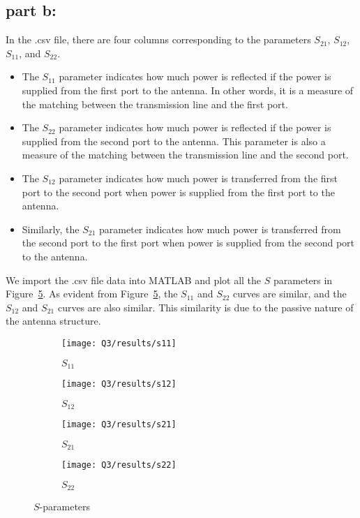 \documentclass[12pt,onecolumn,a4paper]{article}
\begin{document}
	
	
	\FloatBarrier
	\subsection{part b:}
	
	In the .csv file, there are four columns corresponding to the parameters $S_{21}$, $S_{12}$, $S_{11}$, and $S_{22}$. 

	\begin{itemize}
		\item The $S_{11}$ parameter indicates how much power is reflected if the power is supplied from the first port to the antenna. 
		In other words, it is a measure of the matching between the transmission line and the first port. 
		\item The $S_{22}$ parameter indicates how much power is reflected if the power is supplied from the second port to the antenna. 
		This parameter is also a measure of the matching between the transmission line and the second port. 
		\item The $S_{12}$ parameter indicates how much power is transferred from the first port to the second port when power is supplied from the first port to the antenna. 
		\item Similarly, the $S_{21}$ parameter indicates how much power is transferred from the second port to the first port when power is supplied from the second port to the antenna. 
	\end{itemize}

	We import the .csv file data into MATLAB and plot all the $S$ parameters in Figure~\ref{fig:S-parametes}. 
	As evident from Figure~\ref{fig:S-parametes}, the $S_{11}$ and $S_{22}$ curves are similar, and the $S_{12}$ and $S_{21}$ curves are also similar. 
	This similarity is due to the passive nature of the antenna structure.
	
	
	\begin{figure}[H]
		\centering
		\begin{subfigure}{.45\linewidth}
			\centering
			\texttt{[image: Q3/results/s11]}
			\caption{$S_{11}$}
			\label{fig:s11}
		\end{subfigure}
		\hfill
		\begin{subfigure}{.45\linewidth}
			\centering
			\texttt{[image: Q3/results/s12]}
			\caption{$S_{12}$}
			\label{fig:s12}
		\end{subfigure}
		
		\begin{subfigure}{.45\linewidth}
			\centering
			\texttt{[image: Q3/results/s21]}
			\caption{$S_{21}$}
			\label{fig:s21}
		\end{subfigure}
		\hfill
		\begin{subfigure}{.45\linewidth}
			\centering
			\texttt{[image: Q3/results/s22]}
			\caption{$S_{22}$}
			\label{fig:s22}
		\end{subfigure}
		\caption{$S$-parameters}
		\label{fig:S-parametes}
	\end{figure}	
	
\end{document}
